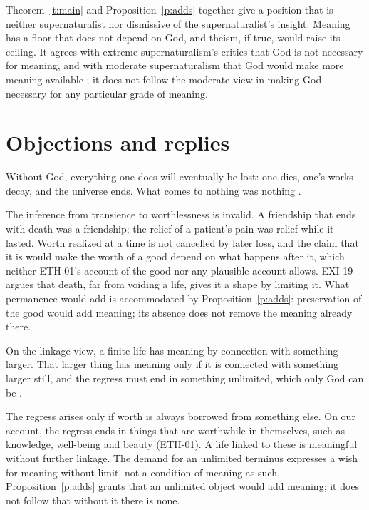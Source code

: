 \documentclass{situationist-preprint}
\begin{document}
Theorem~\ref{t:main} and Proposition~\ref{p:adds} together give a position that is neither supernaturalist nor dismissive of the supernaturalist's insight. Meaning has a floor that does not depend on God, and theism, if true, would raise its ceiling. It agrees with extreme supernaturalism's critics that God is not necessary for meaning, and with moderate supernaturalism that God would make more meaning available \citep{Metz2013}; it does not follow the moderate view in making God necessary for any particular grade of meaning.

\section{Objections and replies}

\begin{objection}\label{o:tolstoy}
Without God, everything one does will eventually be lost: one dies, one's works decay, and the universe ends. What comes to nothing was nothing \citep{Tolstoy1882,Craig2008}.
\end{objection}

\begin{reply}
The inference from transience to worthlessness is invalid. A friendship that ends with death was a friendship; the relief of a patient's pain was relief while it lasted. Worth realized at a time is not cancelled by later loss, and the claim that it is would make the worth of a good depend on what happens after it, which neither ETH-01's account of the good nor any plausible account allows. EXI-19 argues that death, far from voiding a life, gives it a shape by limiting it. What permanence would add is accommodated by Proposition~\ref{p:adds}: preservation of the good would add meaning; its absence does not remove the meaning already there.
\end{reply}

\begin{objection}\label{o:nozick}
On the linkage view, a finite life has meaning by connection with something larger. That larger thing has meaning only if it is connected with something larger still, and the regress must end in something unlimited, which only God can be \citep[ch.~6]{Nozick1981}.
\end{objection}

\begin{reply}
The regress arises only if worth is always borrowed from something else. On our account, the regress ends in things that are worthwhile in themselves, such as knowledge, well-being and beauty (ETH-01). A life linked to these is meaningful without further linkage. The demand for an unlimited terminus expresses a wish for meaning without limit, not a condition of meaning as such. Proposition~\ref{p:adds} grants that an unlimited object would add meaning; it does not follow that without it there is none.
\end{reply}
\end{document}
